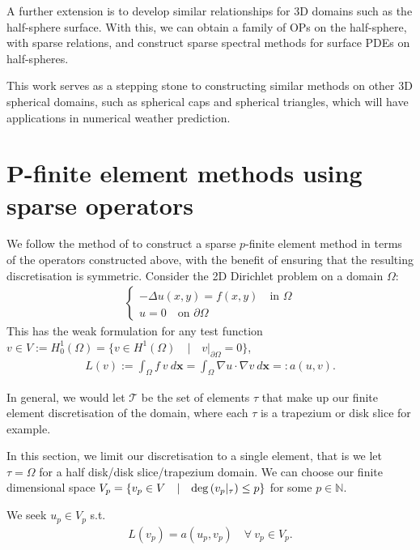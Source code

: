 \documentclass[11pt, oneside]{article}   	%
\newcommand{\N}{\mathbb{N}}
\newcommand{\element}{\tau}
\newcommand{\FEset}{\mathcal{T}}
\begin{document}
A further extension is to develop similar relationships for 3D domains such as the half-sphere surface. With this, we can obtain a family of OPs on the half-sphere, with sparse relations, and construct sparse spectral methods for surface PDEs on half-spheres. 

This work serves as a stepping stone to constructing similar methods on other 3D spherical domains, such as spherical caps and spherical triangles, which will have applications in numerical weather prediction. 

%
\appendix
%
\section{P-finite element methods using sparse operators}\label{Appendix:PFEM}

We follow the method of \cite{beuchler2006new} to construct a sparse $p$-finite element method in terms of the operators constructed above, with the benefit of ensuring that the resulting discretisation is symmetric. Consider the 2D Dirichlet problem on a domain $\Omega$:
\begin{align*}
	\begin{cases}
         - \Delta u(x,y) = f(x,y) \quad \text{in } \Omega \\
         u = 0 \quad \text{on } \partial \Omega
         \end{cases}
\end{align*}
This has the weak formulation for any test function $v \in V := H_0^1(\Omega) = \{v \in H^1(\Omega) \quad | \quad v|_{\partial \Omega} = 0 \}$,
\begin{align*}
	L(v) := \int_\Omega f \: v \: d\mathbf{x} = \int_\Omega \nabla u \cdot \nabla v \: d\mathbf{x} =: a(u,v).
\end{align*}

In general, we would let $\FEset$ be the set of elements $\element$ that make up our finite element discretisation of the domain, where each $\element$ is a trapezium or disk slice for example. 


In this section, we limit our discretisation to a single element, that is we let $\element = \Omega$ for a half disk/disk slice/trapezium domain. We can choose our finite dimensional space $V_p = \{v_p \in V \quad | \quad {\rm deg}\,(v_p|_\element) \le p\}$ for some $p \in \N$.

We seek $u_p \in V_p$ s.t.
\begin{align}
	L(v_p) = a(u_p,v_p) \quad \forall \: v_p \in V_p.
	\label{eqn:FEMweakform}
\end{align}
\end{document}
